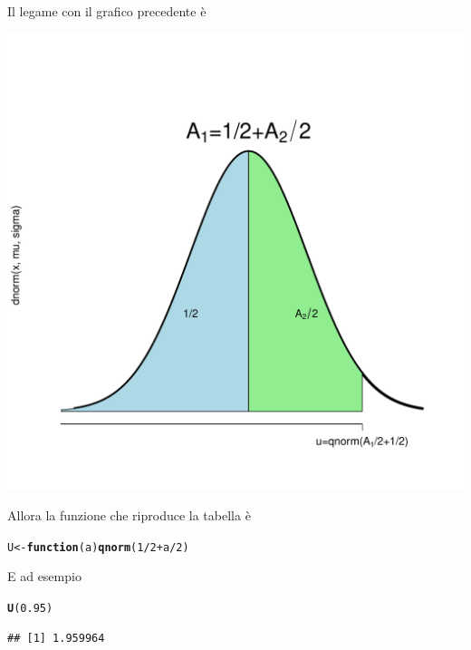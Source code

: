 \documentclass[onecolumn,12pt]{book}\usepackage[]{graphicx}\usepackage[]{color}
\makeatletter
\def\maxwidth{ %
  \ifdim\Gin@nat@width>\linewidth
    \linewidth
  \else
    \Gin@nat@width
  \fi
}
\newcommand{\hlnum}[1]{\textcolor[rgb]{0.686,0.059,0.569}{#1}}%
\newcommand{\hlopt}[1]{\textcolor[rgb]{0,0,0}{#1}}%
\newcommand{\hlstd}[1]{\textcolor[rgb]{0.345,0.345,0.345}{#1}}%
\newcommand{\hlkwa}[1]{\textcolor[rgb]{0.161,0.373,0.58}{\textbf{#1}}}%
\newcommand{\hlkwb}[1]{\textcolor[rgb]{0.69,0.353,0.396}{#1}}%
\newcommand{\hlkwc}[1]{\textcolor[rgb]{0.333,0.667,0.333}{#1}}%
\newcommand{\hlkwd}[1]{\textcolor[rgb]{0.737,0.353,0.396}{\textbf{#1}}}%
\newenvironment{kframe}{%
 \def\at@end@of@kframe{}%
 \ifinner\ifhmode%
  \def\at@end@of@kframe{\end{minipage}}%
  \begin{minipage}{\columnwidth}%
 \fi\fi%
 \def\FrameCommand##1{\hskip\@totalleftmargin \hskip-\fboxsep
 \colorbox{shadecolor}{##1}\hskip-\fboxsep
     \hskip-\linewidth \hskip-\@totalleftmargin \hskip\columnwidth}%
 \MakeFramed {\advance\hsize-\width
   \@totalleftmargin\z@ \linewidth\hsize
   \@setminipage}}%
 {\par\unskip\endMakeFramed%
 \at@end@of@kframe}
\newenvironment{knitrout}{}{} %
\makeatother
\begin{document}
Il legame con il grafico precedente è 

 
\begin{knitrout}
\color{fgcolor}
\includegraphics[width=\maxwidth]{figure/unnamed-chunk-37-1} 

\end{knitrout}

Allora la funzione che riproduce la tabella è
 
\begin{knitrout}
\color{fgcolor}\begin{kframe}
\begin{alltt}
\hlstd{U} \hlkwb{<-}\hlkwa{function} \hlstd{(}\hlkwc{a}\hlstd{)} \hlkwd{qnorm} \hlstd{(}\hlnum{1}\hlopt{/}\hlnum{2} \hlopt{+} \hlstd{a}\hlopt{/}\hlnum{2}\hlstd{)}
\end{alltt}
\end{kframe}
\end{knitrout}
E ad esempio

\begin{knitrout}
\color{fgcolor}\begin{kframe}
\begin{alltt}
\hlkwd{U}\hlstd{(}\hlnum{0.95}\hlstd{)}
\end{alltt}
\begin{verbatim}
## [1] 1.959964
\end{verbatim}
\end{kframe}
\end{knitrout}
\end{document}
